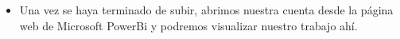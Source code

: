 \begin{itemize}
\begin{figure}[h]
	\begin{center}
	\end{center}
	\end{figure}

\item Una vez se haya terminado de subir, abrimos nuestra cuenta desde la página web de Microsoft PowerBi y podremos visualizar nuestro trabajo ahí.

\begin{figure}[h]
	\begin{center}
	\end{center}
	\end{figure}

\end{itemize}
		